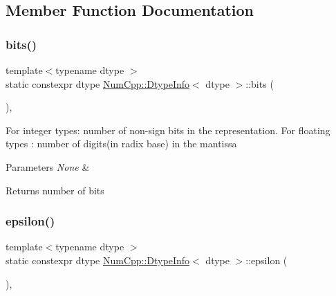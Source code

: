 \subsection{Member Function Documentation}
\mbox{\label{class_num_cpp_1_1_dtype_info_a938bb36dda6d59dccebe73aa25c0e849}} 
\subsubsection{\texorpdfstring{bits()}{bits()}}
{\footnotesize\ttfamily template$<$typename dtype $>$ \\
static constexpr dtype \mbox{\hyperlink{class_num_cpp_1_1_dtype_info}{Num\+Cpp\+::\+Dtype\+Info}}$<$ dtype $>$\+::bits (\begin{DoxyParamCaption}{ }\end{DoxyParamCaption})\hspace{0.3cm}{\ttfamily [inline]}, {\ttfamily [static]}}

For integer types\+: number of non-\/sign bits in the representation. For floating types \+: number of digits(in radix base) in the mantissa


\begin{DoxyParams}{Parameters}
{\em None} & \\
\hline
\end{DoxyParams}
\begin{DoxyReturn}{Returns}
number of bits 
\end{DoxyReturn}
\mbox{\label{class_num_cpp_1_1_dtype_info_a1afd447920d6512f6d3e7acdc08cfca6}} 
\subsubsection{\texorpdfstring{epsilon()}{epsilon()}}
{\footnotesize\ttfamily template$<$typename dtype $>$ \\
static constexpr dtype \mbox{\hyperlink{class_num_cpp_1_1_dtype_info}{Num\+Cpp\+::\+Dtype\+Info}}$<$ dtype $>$\+::epsilon (\begin{DoxyParamCaption}{ }\end{DoxyParamCaption})\hspace{0.3cm}{\ttfamily [inline]}, {\ttfamily [static]}}

